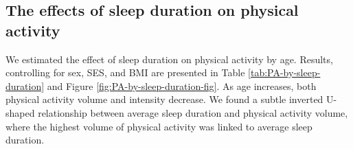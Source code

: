 \documentclass[
  man]{apa6}
\begin{document}
\hypertarget{the-effects-of-sleep-duration-on-physical-activity}{%
\subsection{The effects of sleep duration on physical activity}\label{the-effects-of-sleep-duration-on-physical-activity}}

We estimated the effect of sleep duration on physical activity by age. Results, controlling for sex, SES, and BMI are presented in Table \ref{tab:PA-by-sleep-duration} and Figure \ref{fig:PA-by-sleep-duration-fig}. As age increases, both physical activity volume and intensity decrease. We found a subtle inverted U-shaped relationship between average sleep duration and physical activity volume, where the highest volume of physical activity was linked to average sleep duration.
\end{document}
